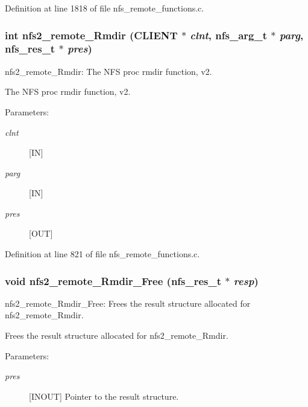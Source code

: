 Definition at line 1818 of file nfs\_\-remote\_\-functions.c.
\subsubsection[{nfs2\_\-remote\_\-Rmdir}]{\setlength{\rightskip}{0pt plus 5cm}int nfs2\_\-remote\_\-Rmdir (CLIENT $\ast$ {\em clnt}, \/  nfs\_\-arg\_\-t $\ast$ {\em parg}, \/  nfs\_\-res\_\-t $\ast$ {\em pres})}\label{group__NFSprocs_gf8ef3a38a9b98e3910ee9e264b6b2f03}


nfs2\_\-remote\_\-Rmdir: The NFS proc rmdir function, v2.

The NFS proc rmdir function, v2.

\begin{Desc}
\item[Parameters:]
\begin{description}
\item[{\em clnt}][IN] \item[{\em parg}][IN] \item[{\em pres}][OUT] \end{description}
\end{Desc}


Definition at line 821 of file nfs\_\-remote\_\-functions.c.
\subsubsection[{nfs2\_\-remote\_\-Rmdir\_\-Free}]{\setlength{\rightskip}{0pt plus 5cm}void nfs2\_\-remote\_\-Rmdir\_\-Free (nfs\_\-res\_\-t $\ast$ {\em resp})}\label{group__NFSprocs_g53bbec2b1f42c5a367af2a27313af076}


nfs2\_\-remote\_\-Rmdir\_\-Free: Frees the result structure allocated for nfs2\_\-remote\_\-Rmdir.

Frees the result structure allocated for nfs2\_\-remote\_\-Rmdir.

\begin{Desc}
\item[Parameters:]
\begin{description}
\item[{\em pres}][INOUT] Pointer to the result structure. \end{description}
\end{Desc}


